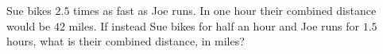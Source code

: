 Sue bikes $2.5$ times as fast as Joe runs. In one hour their combined distance would be $42$ miles. If instead Sue bikes for half an hour and Joe runs for $1.5$ hours, what is their combined distance, in miles?
